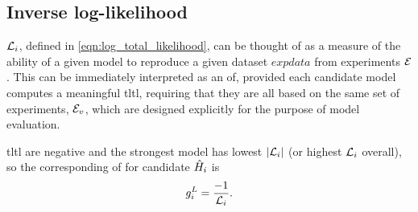 \begin{table}    
    \begin{center}
    \end{center}
    \caption[Objective function examples]{
        Examples of how each \acrfull{of}, $g$ as described in \cref{sec:inverse_ll} to \cref{sec:elo},
            assign selection probability (denoted \%) to the same set of candidate models, $\{\hi\}$ listed in \cref{eqn:obj_fnc_eg_models}, 
            when attempting to learn data from $\ho$. 
        Intermediate quantities, e.g. $w_i^A$, $g_i^p$ are described in the section of the main text describing the corresponding \gls{of}.
        For each model we first summarise its
            $\fs$ (\cref{eqn:f1_score}),
            number of terms $k$,
            median  \gls{likelihood} $\overline{l_e}$ (\cref{eqn:log_likelihood}),     
            and \gls{tltl} $\tll_{i}$ (\cref{eqn:log_total_likelihood}), 
        We use $n=250$ samples, i.e. $\tll_{i}$ is a sum of $n$ \glspl{likelihood} .  
        The set of models is truncated so that only the strongest four are assigned selection probability. 
    }
    \label{table:objective_functions}
\end{table}

\subsection{Inverse log-likelihood}\label{sec:inverse_ll}
$\tll_{i}$, defined in \cref{eqn:log_total_likelihood}, can be thought of as a measure of the 
    ability of a given model to reproduce a given dataset $expdata$ from \glspl{experiment} ${ \mathcal{E} }$.     
This can be immediately interpreted as an \gls{of}, provided each candidate model 
    computes a meaningful \gls{tltl}, requiring that they are all based on the same set of \glspl{experiment}, ${ \mathcal{E} }_v$,
    which are designed explicitly for the purpose of model evaluation. 
\par 

\gls{tltl} are negative and the strongest model has lowest $\lvert {\mathcal{L}}_{i} \rvert$ (or highest $\tll_{i}$ overall),
    so the corresponding \gls{of} for candidate $\hat{H}_i$ is 
\begin{equation}
    \label{eqn:obj_log_likelihood}
    g_i^{L} = \frac{-1}{{\mathcal{L}}_{i}}.
\end{equation}

